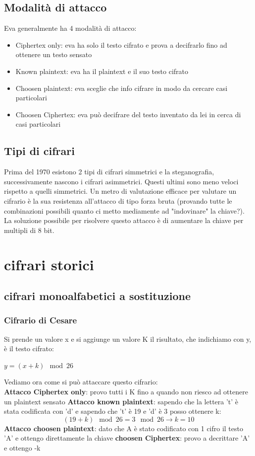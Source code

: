 \documentclass[10pt,a4paper]{article}
\begin{document}
\subsection{Modalità di attacco}
Eva generalmente ha 4 modalità di attacco:\\
\begin{itemize}
\item Ciphertex only: eva ha solo il testo cifrato e prova a decifrarlo fino ad ottenere un testo sensato
\item Known plaintext: eva ha il plaintext e il suo testo cifrato
\item Choosen plaintext: eva sceglie che info cifrare in modo da cercare casi particolari
\item Choosen Ciphertex: eva può decifrare del testo inventato da lei in cerca di casi particolari
\end{itemize}
\subsection{Tipi di cifrari}
Prima del 1970 esistono 2 tipi di cifrari simmetrici e la steganografia, successivamente nascono i cifrari asimmetrici. Questi ultimi sono meno veloci rispetto a quelli simmetrici. Un metro di valutazione efficace per valutare un cifrario è la sua resistenza all'attacco di tipo forza bruta (provando tutte le combinazioni possibili quanto ci metto mediamente ad "indovinare" la chiave?). La soluzione possibile per risolvere questo attacco è di aumentare la chiave per multipli di 8 bit.

\section{cifrari storici}
\subsection{cifrari monoalfabetici a sostituzione}
\subsubsection{Cifrario di Cesare}
Si prende un valore x e si aggiunge un valore K il risultato, che indichiamo con y, è il testo cifrato:
\begin{center}
$y=(x+k)\mod26$
\end{center}
Vediamo ora come si può attaccare questo cifrario:\\
\textbf{Attacco Ciphertex only}: provo tutti i K fino a quando non riesco ad ottenere un plaintext sensato
\textbf{Attacco known plaintext}: sapendo che la lettera 't' è stata codificata con 'd' e sapendo che 't' è 19 e 'd' è 3 posso ottenere k:\\
$$(19+k)\mod26 = 3\mod26 \rightarrow k=10$$
\textbf{Attacco choosen plaintext}: dato che A è stato codificato con 1 cifro il testo 'A' e ottengo direttamente la chiave
\textbf{choosen Ciphertex}: provo a decrittare 'A' e ottengo -k
\end{document}
